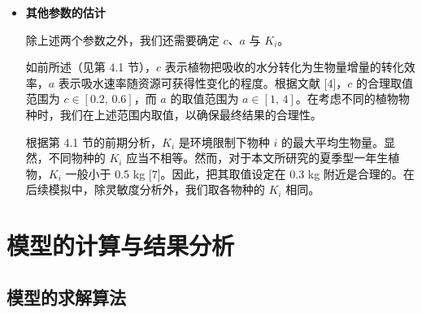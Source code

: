 \documentclass[11pt,a4paper]{ctexart}
\begin{document}
\begin{itemize}
通过分析二叉分枝的特征，我们有
\[
L=b\,l
\]
其中 $L$ 为根系总长度，$l$ 为单条根的平均长度，$b$ 为根系系数，它反映根系中分枝的数目。

接下来，我们把根系总长度与平均根连接长度代入上式，得到
\[
b_{\mathrm{RS}}=\frac{3185.5}{29.8}\approx 106.9,\qquad
b_{\mathrm{NT}}=\frac{4802.5}{49.0}\approx 98.0
\]
随后，我们考虑植物根系会以球形向四周伸展以吸收水分，于是按下式估计根系的直径
\[
D=l\sqrt{b}
\]
该式的含义是：在二叉分枝的结构下，单条根的长度 $l$ 与分枝数目的平方根共同决定了根系在空间中的伸展尺度。代入数据得 $D_{\mathrm{RS}}\approx 3.08$ m，$D_{\mathrm{NT}}\approx 4.85$ m，与荒漠灌木根系水平伸展数米的观测结果一致。

我们把根系简化为半个球体，从而也可得到根系的体积
\[
V=\frac{2}{3}\pi\left(\frac{D}{2}\right)^{3}
\]
再把两个种群单株植物的质量纳入考虑，我们由根系体积与生物量之间的比例关系确定 $\lambda_{\mathrm{RS}}$ 与 $\lambda_{\mathrm{NT}}$。由于这两个种群在干旱地区具有代表性，我们依据二者取值的平均来估计通用的比例因子 $\lambda$，即
\[
\lambda=\frac{\lambda_{\mathrm{RS}}+\lambda_{\mathrm{NT}}}{2}\approx 2.7\times 10^{7}\ \mathrm{cm^{3}\cdot kg^{-1}}
\]
由于 $\lambda$ 是根系体积与植物生物量之间的比例因子，它反映的是一种普遍规律。因此，我们认为不同植物的这一比例因子近似相等。在模拟中，我们用 $\lambda$ 统一替代不同物种的比例因子 $\lambda_i$。

\item \textbf{其他参数的估计}

除上述两个参数之外，我们还需要确定 $c$、$a$ 与 $K_i$。

如前所述（见第 4.1 节），$c$ 表示植物把吸收的水分转化为生物量增量的转化效率，$a$ 表示吸水速率随资源可获得性变化的程度。根据文献 [4]，$c$ 的合理取值范围为 $c\in[0.2,\,0.6]$，而 $a$ 的取值范围为 $a\in[1,\,4]$。在考虑不同的植物物种时，我们在上述范围内取值，以确保最终结果的合理性。

根据第 4.1 节的前期分析，$K_i$ 是环境限制下物种 $i$ 的最大平均生物量。显然，不同物种的 $K_i$ 应当不相等。然而，对于本文所研究的夏季型一年生植物，$K_i$ 一般小于 0.5 kg [7]。因此，把其取值设定在 0.3 kg 附近是合理的。在后续模拟中，除灵敏度分析外，我们取各物种的 $K_i$ 相同。
\end{itemize}

\section{模型的计算与结果分析}

\subsection{模型的求解算法}
\end{document}
